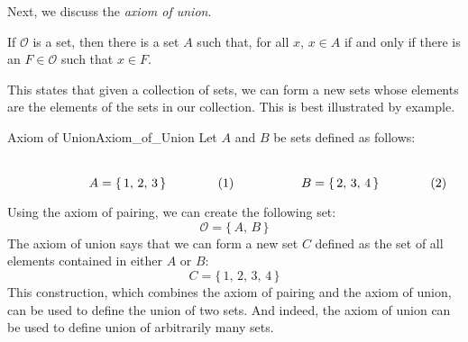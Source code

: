        Next, we discuss the \textit{axiom of union}.
        \begin{axiom}
            \label{ax:Axiom_of_Union}%
            If $\mathcal{O}$ is a set, then there is a set $A$ such that, for
            all $x$, $x\in{A}$ if and only if there is an $F\in\mathcal{O}$
            such that $x\in{F}$.
        \end{axiom}
        This states that given a collection of sets, we can form a new sets
        whose elements are the elements of the sets in our collection. This
        is best illustrated by example.
        \begin{lexample}{Axiom of Union}{Axiom_of_Union}
            Let $A$ and $B$ be sets defined as follows:
            \par
            \begin{subequations}
                \begin{minipage}[b]{0.49\textwidth}
                    \centering
                    \begin{equation}
                        A=\{\,1,\,2,\,3\,\}
                    \end{equation}
                \end{minipage}
                \hfill
                \begin{minipage}[b]{0.49\textwidth}
                    \centering
                    \begin{equation}
                        B=\{\,2,\,3,\,4\,\}
                    \end{equation}
                \end{minipage}
            \end{subequations}
            \par
            \vspace{2.5ex}
            Using the axiom of pairing, we can create the following set:
            \begin{equation}
                \mathcal{O}=\{\,A,\,B\,\}
            \end{equation}
            The axiom of union says that we can form a new set $C$ defined as
            the set of all elements contained in either $A$ or $B$:
            \begin{equation}
                C=\{\,1,\,2,\,3,\,4\,\}
            \end{equation}
            This construction, which combines the axiom of pairing and the
            axiom of union, can be used to define the union of two sets. And
            indeed, the axiom of union can be used to define union of
            arbitrarily many sets.
        \end{lexample}
